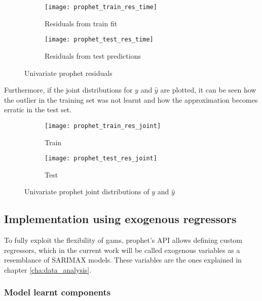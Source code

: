\begin{figure}[hptb]
	\begin{subfigure}{.47\textwidth}
		\texttt{[image: prophet\_train\_res\_time]}
		\caption{Residuals from train fit}
		\label{fig:prophet_train_res_time}
	\end{subfigure}%
	\hfill
	\begin{subfigure}{.47\textwidth}
		\texttt{[image: prophet\_test\_res\_time]}
		\caption{Residuals from test predictions}
		\label{fig:prophet_test_res_time}
	\end{subfigure}
	\caption{Univariate prophet residuals}
	\label{fig:prophet_res_time}
\end{figure}

Furthermore, if the joint distributions for $y$ and $\hat{y}$ are plotted, it can be seen how the outlier in the training set was not learnt and how the approximation becomes erratic in the test set.

\begin{figure}[hptb]
	\begin{subfigure}{.47\textwidth}
		\texttt{[image: prophet\_train\_res\_joint]}
		\caption{Train}
		\label{fig:prophet_train_res_joint}
	\end{subfigure}%
	\hfill
	\begin{subfigure}{.47\textwidth}
		\texttt{[image: prophet\_test\_res\_joint]}
		\caption{Test}
		\label{fig:prophet_test_res_joint}
	\end{subfigure}
	\caption{Univariate prophet joint distributions of $y$ and $\hat{y}$}
	\label{fig:prophet_res_joint}
\end{figure}


\subsection{Implementation using exogenous regressors}

To fully exploit the flexibility of \acp{gam}, prophet's API allows defining custom regressors, which in the current work will be called exogenous variables as a resemblance of SARIMAX models. These variables are the ones explained in chapter \ref{cha:data_analysis}.



\subsubsection*{Model learnt components}

